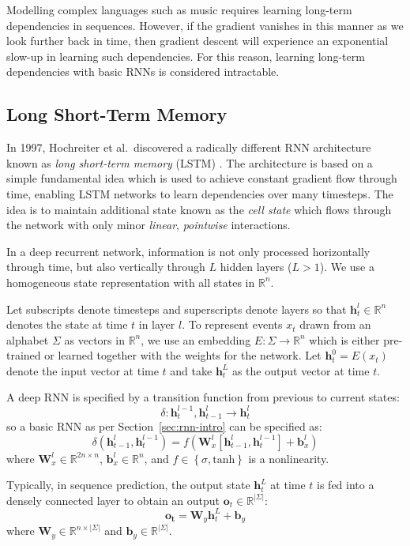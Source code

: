 \documentclass[12pt,a4paper,twoside,openright]{report}
\newcommand{\set}[1]{ \left\{ #1 \right\} }
\newcommand{\vect}[1]{\boldsymbol{\mathbf{#1}}}
\begin{document}
Modelling complex languages such as music requires learning long-term
dependencies in sequences. However, if the gradient vanishes in this manner as
we look further back in time, then gradient descent will experience an
exponential slow-up in learning such dependencies. For this reason, learning
long-term dependencies with basic RNNs is considered intractable.

\subsection{Long Short-Term Memory}\label{sec:lstm-prep}

In 1997, Hochreiter et al.\ discovered a radically different RNN architecture
known as \emph{long short-term memory} (LSTM) \cite{hochreiter1997long}. The
architecture is based on a simple fundamental idea which is used to achieve
constant gradient flow through time, enabling LSTM networks to learn
dependencies over many timesteps. The idea is to maintain additional state known
as the \emph{cell state} which flows through the network with only minor
\emph{linear}, \emph{pointwise} interactions.

In a deep recurrent network, information is not only processed horizontally
through time, but also vertically through $L$ hidden layers ($L > 1$). We use a
homogeneous state representation with all states in $\mathbb{R}^n$.

Let subscripts denote timesteps and superscripts denote layers so that
$\vect{h}_t^l \in \mathbb{R}^n$ denotes the state at time $t$ in layer $l$. To
represent events $x_t$ drawn from an alphabet $\Sigma$ as vectors in
$\mathbb{R}^n$, we use an embedding $E : \Sigma \rightarrow \mathbb{R}^n$ which
is either pre-trained or learned together with the weights for the network. Let
$\vect{h}_t^0 = E(x_t)$ denote the input vector at time $t$ and take
$\vect{h}_t^L$ as the output vector at time $t$.

A deep RNN is specified by a transition function from previous to current
states:
$$ \delta : \vect{h}_t^{l-1}, \vect{h}_{t-1}^l \rightarrow \vect{h}_t^l $$
so a basic RNN as per Section~\ref{sec:rnn-intro} can be specified as:
$$ \delta(\vect{h}_{t-1}^l, \vect{h}_t^{l-1}) = f(\vect{W}^l_x [\vect{h}_{t-1}^l,
\vect{h}_t^{l-1}] + \vect{b}^l_x) $$
where $\vect{W}^l_x \in \mathbb{R}^{2n \times n}$, $\vect{b}^l_x \in
\mathbb{R}^n$, and $f \in \set{ \sigma, \mathrm{tanh} }$ is a nonlinearity.

Typically, in sequence prediction, the output state $\vect{h}_t^L$ at time $t$
is fed into a densely connected layer to obtain an output $\vect{o}_t \in
\mathbb{R}^{|\Sigma|}$:
$$ \vect{o_t} = \vect{W}_y \vect{h}_t^L + \vect{b}_y $$
where $\vect{W}_y \in \mathbb{R}^{n \times |\Sigma|}$ and $\vect{b}_y \in
\mathbb{R}^{|\Sigma|}$. 
\end{document}
